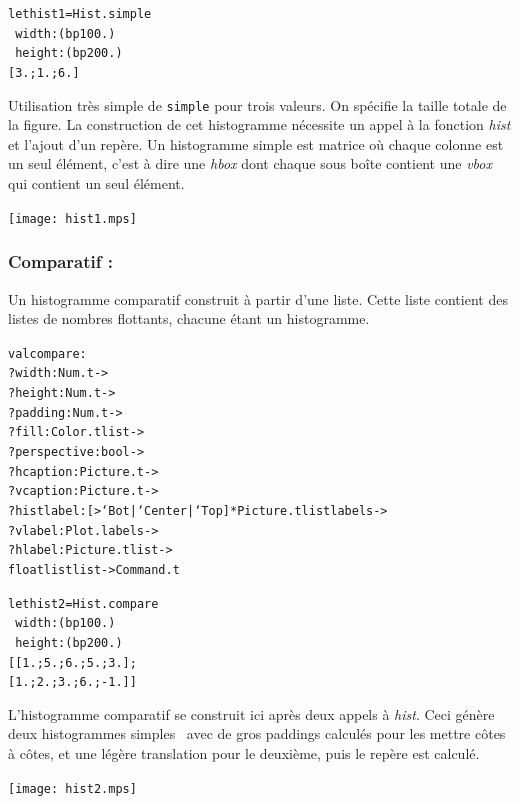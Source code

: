 \documentclass[a4paper,12pt]{article}
\begin{document}
\bigskip

\begin{minipage}{0.5\linewidth}
  \begin{alltt}
    let hist1 = Hist.simple
    ~width:(bp 100.)
    ~height:(bp 200.)
    [3.;1.;6.]
  \end{alltt}

  Utilisation très simple de \texttt{simple} pour trois valeurs. On spécifie la taille totale de la figure. La construction de cet histogramme nécessite un appel à la fonction \textit{hist} et l'ajout d'un repère. Un histogramme simple est matrice où chaque colonne est un seul élément, c'est à dire une \textit{hbox} dont chaque sous boîte contient une \textit{vbox} qui contient un seul élément.
\end{minipage}
\begin{minipage}{0.5\linewidth}
  \begin{center}
    \texttt{[image: hist1.mps]}
  \end{center}
\end{minipage}

\subsubsection{Comparatif :} 
Un histogramme comparatif construit à partir d'une liste. Cette liste
contient des listes de nombres flottants, chacune étant un histogramme.
\begin{alltt}
  val compare :
  ?width:Num.t ->
  ?height:Num.t ->
  ?padding:Num.t ->
  ?fill:Color.t list ->
  ?perspective: bool ->
  ?hcaption:Picture.t ->
  ?vcaption:Picture.t ->
  ?histlabel:[> `Bot | `Center | `Top ] * Picture.t list labels ->
  ?vlabel:Plot.labels ->
  ?hlabel:Picture.t list ->
  float list list -> Command.t
\end{alltt}

\bigskip

\begin{minipage}{0.5\linewidth}
  \begin{alltt}
    let hist2 = Hist.compare
    ~width:(bp 100.)
    ~height:(bp 200.)
    [[1.;5.;6.;5.;3.];
      [1.;2.;3.;6.;-1.]]
  \end{alltt}
  
  L'histogramme comparatif se construit ici après deux appels à \textit{hist}. Ceci génère deux histogrammes \og simples \fg\, avec de gros paddings calculés pour les mettre côtes à côtes, et une légère translation pour le deuxième, puis le repère est calculé.
\end{minipage}
\begin{minipage}{0.5\linewidth}
\begin{center}
\texttt{[image: hist2.mps]}
\end{center}
\end{minipage}
\end{document}
